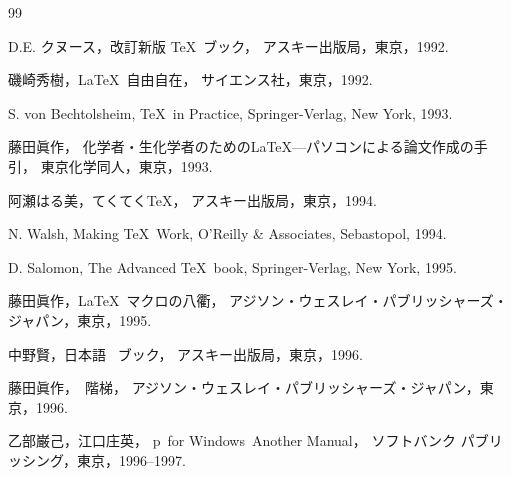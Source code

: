 \documentclass[technicalreport]{ieicej}
\newcommand{\AmSLaTeX}{%
 $\mathcal A$\lower.4ex\hbox{$\!\mathcal M\!$}$\mathcal S$-\LaTeX}
\begin{document}
\begin{thebibliography}{99}





D.E. クヌース，改訂新版 \TeX\ ブック，
アスキー出版局，東京，1992. 

磯崎秀樹，\LaTeX\ 自由自在，
サイエンス社，東京，1992. 


S. von Bechtolsheim, \TeX\ in Practice, 
Springer-Verlag, New York, 1993. 


藤田眞作，
化学者・生化学者のための\LaTeX---パソコンによる論文作成の手引，
東京化学同人，東京，1993. 


阿瀬はる美，てくてく\TeX{}，
アスキー出版局，東京，1994. 

N. Walsh, Making \TeX\ Work, 
O'Reilly \& Associates, Sebastopol, 1994. 

D. Salomon, The Advanced \TeX\ book, 
Springer-Verlag, New York, 1995.

藤田眞作，\LaTeX\ マクロの八衢，
アジソン・ウェスレイ・パブリッシャーズ・ジャパン，東京，1995. 

中野賢，日本語 \LaTeXe\ ブック，
アスキー出版局，東京，1996. 

藤田眞作，\LaTeXe\ 階梯，
アジソン・ウェスレイ・パブリッシャーズ・ジャパン，東京，1996. 

乙部巌己，江口庄英，
p\LaTeXe\ for Windows\ Another Manual，
ソフトバンク パブリッシング，東京，1996--1997. 


\end{thebibliography}
\end{document}
